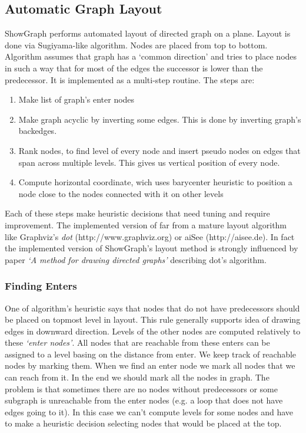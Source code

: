 \documentclass[11pt,twoside,a4paper]{article}
\begin{document}
\subsection{Automatic Graph Layout}
ShowGraph performs automated layout of directed graph on a plane. Layout is done via Sugiyama-like algorithm. Nodes are placed from top to bottom. Algorithm assumes that graph has a `common direction' and tries to place nodes in such a way that for most of the edges the successor is lower than the predecessor. It is implemented as a multi-step routine. The steps are:
\begin{enumerate}
\item Make list of graph's enter nodes
\item Make graph acyclic by inverting some edges. This is done by inverting graph's backedges.
\item Rank nodes, to find level of every node and insert pseudo nodes on edges that span across multiple levels. This gives us vertical position of every node.
\item Compute horizontal coordinate, wich uses barycenter heuristic to position a node close to the nodes connected with it on other levels
\end{enumerate}
Each of these steps make heuristic decisions that need tuning and require improvement. The implemented version of far from a mature layout algorithm like Graphviz's \emph{dot} (http://www.graphviz.org) or aiSee (http://aisee.de). In fact the implemented version of ShowGraph's layout method is strongly influenced by paper \emph{`A method for drawing directed graphs'} describing dot's algorithm.

\subsubsection{Finding Enters}
One of algorithm's heuristic says that nodes that do not have predecessors should be placed on topmost level in layout. This rule generally supports idea of drawing edges in downward direction. Levels of the other nodes are computed relatively to these \emph{`enter nodes'}. All nodes that are reachable from these enters can be assigned to a level basing on the distance from enter. We keep track of reachable nodes by marking them. When we find an enter node we mark all nodes that we can reach from it. In the end we should mark all the nodes in graph. The problem is that sometimes there are no nodes without predecessors or some subgraph is unreachable from the enter nodes (e.g. a loop that does not have edges going to it). In this case we can't compute levels for some nodes and have to make a heuristic decision selecting nodes that would be placed at the top.
\end{document}
